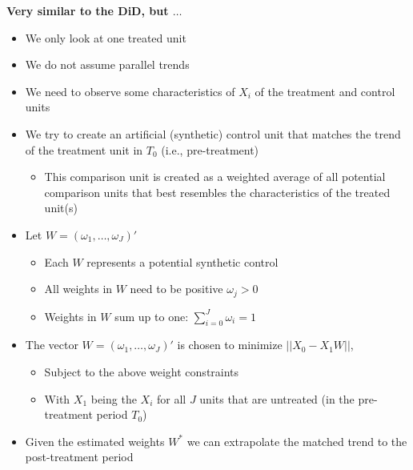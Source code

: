 \documentclass[10pt]{article}
\begin{document}
\textbf{Very similar to the DiD, but $\dots$}
\begin{itemize}
    \item We only look at one treated unit 
    \item We do not assume parallel trends 
    \item We need to observe some characteristics of $X_i $ of the treatment and control units
\end{itemize}
\newpage 
\begin{itemize}
    \item We try to create an artificial (synthetic) control unit that matches the trend of the treatment unit in $T_0 $ (i.e., pre-treatment)
    \begin{itemize}
        \item This comparison unit is created as a weighted average of all potential comparison units that best resembles the characteristics of the treated unit(s)
    \end{itemize}
    \item Let $W = (\omega_1,\dots, \omega_J)' $
    \begin{itemize}
        \item Each $W $ represents a potential synthetic control 
        \item All weights in $W $ need to be positive $\omega_j > 0 $
        \item Weights in $W $ sum up to one: $\sum_{i = 0}^J \omega_i = 1 $
    \end{itemize}
    \item The vector $W = (\omega_1,\dots, \omega_J)' $ is chosen to minimize $||X_0 - X_1W|| $,
    \begin{itemize}
        \item Subject to the above weight constraints 
        \item With $X_1 $ being the $X_i $ for all $J $ units that are untreated (in the pre-treatment period $T_0 $)
    \end{itemize}
    \item Given the estimated weights $W^* $ we can extrapolate the matched trend to the post-treatment period 
\end{itemize}
\end{document}
